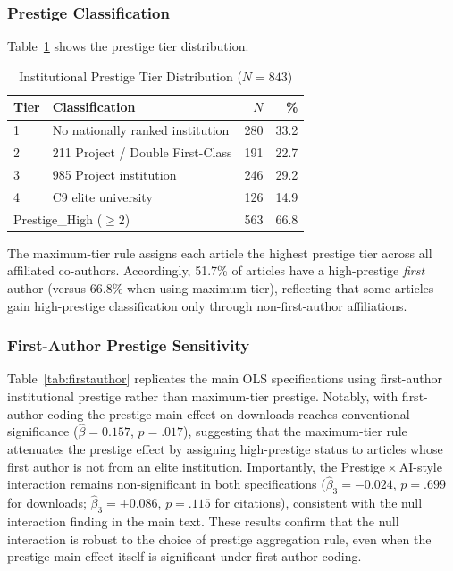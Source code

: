 \documentclass[12pt,a4paper]{article}
\begin{document}
\subsubsection*{Prestige Classification}

Table~\ref{tab:prestgedist} shows the prestige tier distribution.

\begin{table}[htbp]
\centering
\caption{Institutional Prestige Tier Distribution ($N = 843$)}
\label{tab:prestgedist}
\begin{tabular}{llrr}
\toprule
Tier & Classification & $N$ & \% \\
\midrule
1 & No nationally ranked institution & 280 & 33.2 \\
2 & 211 Project / Double First-Class & 191 & 22.7 \\
3 & 985 Project institution          & 246 & 29.2 \\
4 & C9 elite university              & 126 & 14.9 \\
\midrule
\multicolumn{2}{l}{Prestige\_High ($\geq 2$)} & 563 & 66.8 \\
\bottomrule
\end{tabular}
\end{table}

The maximum-tier rule assigns each article the highest prestige tier
across all affiliated co-authors.
Accordingly, 51.7\% of articles have a high-prestige \textit{first} author
(versus 66.8\% when using maximum tier), reflecting that some articles
gain high-prestige classification only through non-first-author affiliations.

\subsubsection*{First-Author Prestige Sensitivity}

Table~\ref{tab:firstauthor} replicates the main OLS specifications
using first-author institutional prestige rather than maximum-tier
prestige.
Notably, with first-author coding the prestige main effect
on downloads reaches conventional significance
($\hat\beta = 0.157$, $p = .017$), suggesting that the maximum-tier
rule attenuates the prestige effect by assigning high-prestige status
to articles whose first author is not from an elite institution.
Importantly, the Prestige\,$\times$\,AI-style interaction remains
non-significant in both specifications
($\hat\beta_3 = -0.024$, $p = .699$ for downloads;
$\hat\beta_3 = +0.086$, $p = .115$ for citations),
consistent with the null interaction finding in the main text.
These results confirm that the null interaction is robust to the
choice of prestige aggregation rule, even when the prestige main
effect itself is significant under first-author coding.
\end{document}
